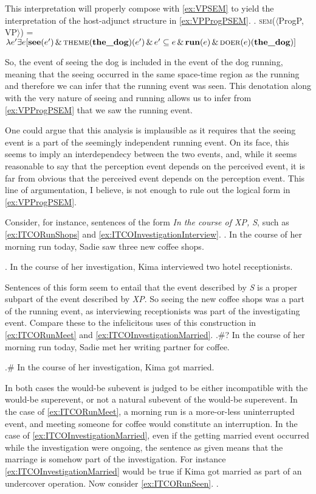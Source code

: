 \documentclass[MilwayThesis]{subfiles}
\begin{document}
This interpretation will properly compose with \cref{ex:VPSEM} to yield the interpretation of the host-adjunct structure in \cref{ex:VPProgPSEM}.
\ex.\label{ex:VPProgPSEM} \textsc{sem}($\langle$ProgP, VP$\rangle$) = $\lambda e^{\prime} \exists e [ \textbf{see}(e^{\prime})\,\&\,\textsc{theme}(\textbf{the\_dog})(e^{\prime})\,\&\,e^{\prime} \subseteq e\,\&\,\textbf{run}(e)\,\&\,\textsc{doer}(e)(\textbf{the\_dog})]$

So, the event of seeing the dog is included in the event of the dog running, meaning that the seeing occurred in the same space-time region as the running and therefore we can infer that the running event was seen.
This denotation along with the very nature of seeing and running allows us to infer from \cref{ex:VPProgPSEM} that we saw the running event.

One could argue that this analysis is implausible as it requires that the seeing event is a part of the seemingly independent running event.
On its face, this seems to imply an interdependecy between the two events, and, while it seems reasonable to say that the perception event depends on the perceived event, it is far from obvious that the perceived event depends on the perception event.
This line of argumentation, I believe, is not enough to rule out the logical form in \cref{ex:VPProgPSEM}.

Consider, for instance, sentences of the form \textit{In the course of XP, S}, such as \cref{ex:ITCORunShops} and \cref{ex:ITCOInvestigationInterview}.
\ex.\label{ex:ITCORunShops} In the course of her morning run today, Sadie saw three new coffee shops.

\ex.\label{ex:ITCOInvestigationInterview} In the course of her investigation, Kima interviewed two hotel receptionists.

Sentences of this form seem to entail that the event described by \textit{S} is a proper subpart of the event described by \textit{XP}.
So seeing the new coffee shops was a part of the running event, as interviewing receptionists was part of the investigating event.
Compare these to the infelicitous uses of this construction in \cref{ex:ITCORunMeet} and \cref{ex:ITCOInvestigationMarried}.
\ex.\#? In the course of her morning run today, Sadie met her writing partner for coffee.\label{ex:ITCORunMeet}

\ex.\# In the course of her investigation, Kima got married.\label{ex:ITCOInvestigationMarried}

In both cases the would-be subevent is judged to be either incompatible with the would-be superevent, or not a natural subevent of the would-be superevent.
In the case of \cref{ex:ITCORunMeet}, a morning run is a more-or-less uninterrupted event, and meeting someone for coffee would constitute an interruption.
In the case of \cref{ex:ITCOInvestigationMarried}, even if the getting married event occurred while the investigation were ongoing, the sentence as given means that the marriage is somehow part of the investigation.
For instance \cref{ex:ITCOInvestigationMarried} would be true if Kima got married as part of an undercover operation.
Now consider \cref{ex:ITCORunSeen}.
\ex.\label{ex:ITCORunSeen} 
\end{document}
